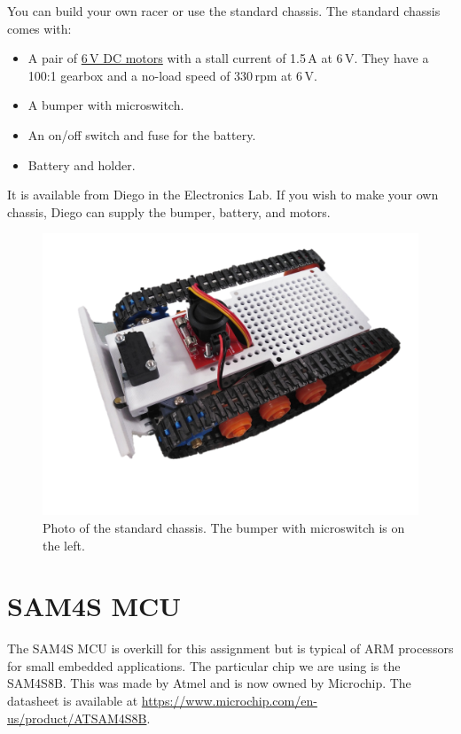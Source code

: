 You can build your own racer or use the standard chassis.  The
standard chassis comes with:
%
\begin{itemize}
\item A pair of \href{https://www.pololu.com/product/3065}{6\,V DC
  motors} with a stall current of 1.5\,A at 6\,V.  They have a 100:1
  gearbox and a no-load speed of 330\,rpm at 6\,V.

\item A bumper with microswitch.

\item An on/off switch and fuse for the battery.

\item Battery and holder.
\end{itemize}
%
It is available from Diego in the Electronics Lab.  If you wish to
make your own chassis, Diego can supply the bumper, battery, and
motors.


\begin{figure}[!h]
  \centering \includegraphics[width=5in]{figs/chassis.jpg}
  \caption{Photo of the standard chassis.  The bumper with
    microswitch is on the left.}
  \label{fig:chassis}
\end{figure}



\section{SAM4S MCU}\label{sam4s-mcu}

The SAM4S MCU is overkill for this assignment but is typical of ARM
processors for small embedded applications.  The particular chip we
are using is the SAM4S8B.  This was made by Atmel and is now owned by
Microchip.  The datasheet is available at
\url{https://www.microchip.com/en-us/product/ATSAM4S8B}.

